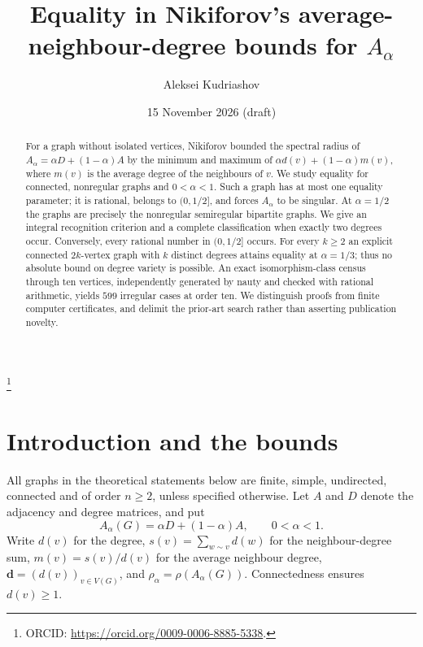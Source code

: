 \documentclass[11pt]{amsart}
\theoremstyle{remark}
\newcommand{\dd}{\boldsymbol{d}}
\begin{document}
\title[Equality in average-neighbour-degree bounds]{Equality in Nikiforov's average-neighbour-degree bounds for $A_\alpha$}
\author{Aleksei Kudriashov}
\address{Athanor lab, Bali, Indonesia}
\thanks{ORCID: \url{https://orcid.org/0009-0006-8885-5338}.}
\date{15 November 2026 (draft)}

\begin{abstract}
For a graph without isolated vertices, Nikiforov bounded the spectral radius
of $A_\alpha=\alpha D+(1-\alpha)A$ by the minimum and maximum of
$\alpha d(v)+(1-\alpha)m(v)$, where $m(v)$ is the average degree of the
neighbours of $v$. We study equality for connected, nonregular graphs and
$0<\alpha<1$. Such a graph has at most one equality parameter; it is
rational, belongs to $(0,1/2]$, and forces $A_\alpha$ to be singular.
At $\alpha=1/2$ the graphs are precisely the nonregular semiregular
bipartite graphs. We give an integral recognition criterion and a complete
classification when exactly two degrees occur. Conversely, every rational
number in $(0,1/2]$ occurs. For every $k\geq 2$ an explicit connected
$2k$-vertex graph with $k$ distinct degrees attains equality at $\alpha=1/3$;
thus no absolute bound on degree variety is possible. An exact
isomorphism-class census through ten vertices, independently generated by
nauty and checked with rational arithmetic, yields $599$ irregular cases
at order ten. We distinguish proofs from finite computer certificates,
and delimit the prior-art search rather than asserting publication novelty.
\end{abstract}
\maketitle

\section{Introduction and the bounds}
All graphs in the theoretical statements below are finite, simple, undirected,
connected and of order $n\geq2$, unless specified otherwise. Let $A$ and $D$
denote the adjacency and degree matrices, and put
\[
 A_\alpha(G)=\alpha D+(1-\alpha)A,\qquad 0<\alpha<1.
\]
Write $d(v)$ for the degree, $s(v)=\sum_{w\sim v}d(w)$ for the
neighbour-degree sum, $m(v)=s(v)/d(v)$ for the average neighbour degree,
$\dd=(d(v))_{v\in V(G)}$, and $\rho_\alpha=\rho(A_\alpha(G))$.
Connectedness ensures $d(v)\geq1$.
\end{document}
